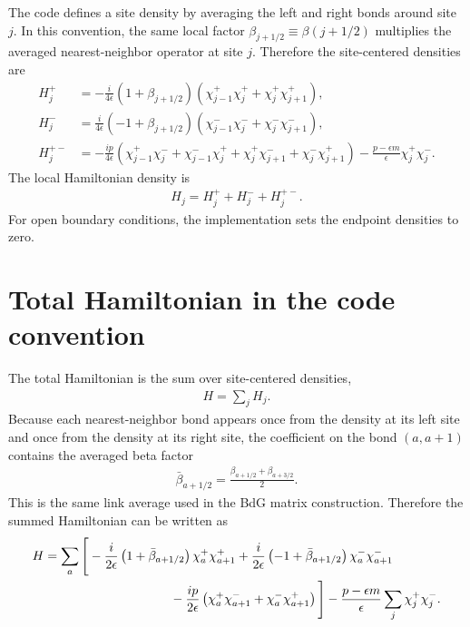 \documentclass[11pt,a4paper]{article}
\newcommand{\eps}{\epsilon}
\newcommand{\bbeta}{\beta}
\begin{document}
The code defines a site density by averaging the left and right bonds around
site $j$.  In this convention, the same local factor
$\bbeta_{j+1/2}\equiv \bbeta(j+1/2)$ multiplies the averaged
nearest-neighbor operator at site $j$.
Therefore the site-centered densities are
\begin{align}
  H_j^+
  &=
  -\frac{i}{4\eps}
  \left(1+\bbeta_{j+1/2}\right)
  \left(
    \chi_{j-1}^+\chi_j^+
    +
    \chi_j^+\chi_{j+1}^+
  \right),
  \\
  H_j^-
  &=
  \frac{i}{4\eps}
  \left(-1+\bbeta_{j+1/2}\right)
  \left(
    \chi_{j-1}^-\chi_j^-
    +
    \chi_j^-\chi_{j+1}^-
  \right),
  \\
  H_j^{+-}
  &=
  -\frac{i p}{4\eps}
  \left(
    \chi_{j-1}^+\chi_j^-
    +
    \chi_{j-1}^-\chi_j^+
    +
    \chi_j^+\chi_{j+1}^-
    +
    \chi_j^-\chi_{j+1}^+
  \right)
  -
  \frac{p-\eps m}{\eps}\chi_j^+\chi_j^- .
\end{align}
The local Hamiltonian density is
\begin{align}
  H_j
  =
  H_j^+ + H_j^- + H_j^{+-}.
\end{align}
For open boundary conditions, the implementation sets the endpoint densities
to zero.

\section{Total Hamiltonian in the code convention}

The total Hamiltonian is the sum over site-centered densities,
\begin{align}
  H = \sum_j H_j .
\end{align}
Because each nearest-neighbor bond appears once from the density at its left
site and once from the density at its right site, the coefficient on the bond
$(a,a+1)$ contains the averaged beta factor
\begin{align}
  \bar{\bbeta}_{a+1/2}
  =
  \frac{\bbeta_{a+1/2}+\bbeta_{a+3/2}}{2}.
\end{align}
This is the same link average used in the BdG matrix construction.  Therefore
the summed Hamiltonian can be written as
\begin{align}
  H
  &=
  \sum_a
  \Bigg[
    -\frac{i}{2\eps}
    \left(1+\bar{\bbeta}_{a+1/2}\right)
    \chi_a^+\chi_{a+1}^+
    +
    \frac{i}{2\eps}
    \left(-1+\bar{\bbeta}_{a+1/2}\right)
    \chi_a^-\chi_{a+1}^-
    \nonumber\\
  &\hspace{35mm}
    -
    \frac{i p}{2\eps}
    \left(
      \chi_a^+\chi_{a+1}^-
      +
      \chi_a^-\chi_{a+1}^+
    \right)
  \Bigg]
  -
  \frac{p-\eps m}{\eps}
  \sum_j
  \chi_j^+\chi_j^- .
\end{align}
\end{document}
